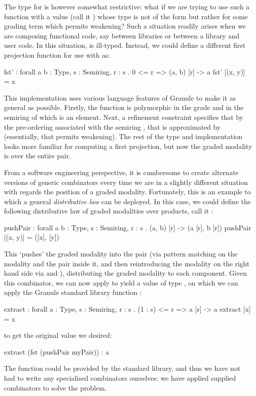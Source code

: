 The type for  is however somewhat restrictive: what if we are trying
to use such a function with a value (call it ) whose type is not
of the form  but rather  for some grading
term  which permits weakening? Such a situation readily arises when we
are composing functional code, say between libraries or between a library and
user code. In this situation,  is ill-typed. Instead, we
could define a different first projection function for use with  as:
%
\begin{granule}
fst' : forall { a b : Type, s : Semiring, r : s } 
     . {0 <= r} => (a, b) [r] -> a
fst' [(x, y)] = x
\end{granule}
%
This implementation uses various language features of Granule to make it as
general as possible. Firstly, the function is polymorphic in the grade
 and in the semiring  of which  is an element.
Next, a refinement constraint  specifies that by the pre-ordering
\granin{<=} associated with the semiring , that  is
approximated by  (essentially, that  permits weakening). The
rest of the type and implementation looks more familiar for computing a first
projection, but now the graded modality is over the entire pair.

From a software engineering perspective, it is cumbersome to create alternate
versions of generic combinators every time we are in a slightly different
situation with regards the position of a graded modality.  Fortunately, this is
an example to which a general \emph{distributive law} can be deployed. In this
case, we could define the following distributive law of graded modalities over
products, call it :
%
\begin{granule}
pushPair : forall { a b : Type, s : Semiring, r : s } 
         . (a, b) [r] -> (a [r], b [r])
pushPair [(x, y)] = ([x], [y])
\end{granule}
%
This `pushes' the graded modality  into the pair (via pattern matching
on the modality and the pair inside it, and then reintroducing the modality on
the right hand side via \granin{[x]} and \granin{[y]}), distributing the graded
modality to each component. Given this combinator, we can now apply  to yield a value of type , on which we can
apply the Granule standard library function :
\begin{granule}
extract : forall { a : Type, s : Semiring, r : s }
        . {(1 : s) <= r} => a [r] -> a
extract [x] = x
\end{granule}
 to get the original  value we desired:
%
\begin{granule}
extract (fst (pushPair myPair)) : a
\end{granule}
%
The  function could be provided by the standard
library, and thus we have not had to write any specialised combinators
ourselves: we have applied supplied combinators to solve the problem.

